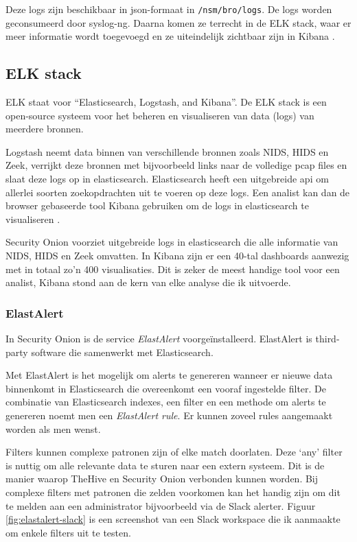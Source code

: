 \documentclass[a4paper,12pt]{report}
\begin{document}
Deze logs zijn beschikbaar in json-formaat in \lstinline|/nsm/bro/logs|.
De logs worden geconsumeerd door syslog-ng.
Daarna komen ze terrecht in de ELK stack, waar er meer informatie wordt toegevoegd en ze uiteindelijk zichtbaar zijn in Kibana \autocite{so:docs}.

\subsection{ELK stack}
ELK staat voor ``Elasticsearch, Logstash, and Kibana''.
De ELK stack is een open-source systeem voor het beheren en visualiseren van data (logs) van meerdere bronnen.

Logstash neemt data binnen van verschillende bronnen zoals NIDS, HIDS en Zeek, verrijkt deze bronnen met bijvoorbeeld links naar de volledige pcap files en slaat deze logs op in elasticsearch.
Elasticsearch heeft een uitgebreide api om allerlei soorten zoekopdrachten uit te voeren op deze logs.
Een analist kan dan de browser gebaseerde tool Kibana gebruiken om de logs in elasticsearch te visualiseren \autocite{elastic:what-is-elk}.

Security Onion voorziet uitgebreide logs in elasticsearch die alle informatie van NIDS, HIDS en Zeek omvatten.
In Kibana zijn er een 40-tal dashboards aanwezig met in totaal zo'n 400 visualisaties.
Dit is zeker de meest handige tool voor een analist, Kibana stond aan de kern van elke analyse die ik uitvoerde.

\subsubsection{ElastAlert}
In Security Onion is de service \emph{ElastAlert} voorgeïnstalleerd.
ElastAlert is third-party software die samenwerkt met Elasticsearch.

Met ElastAlert is het mogelijk om alerts te genereren wanneer er nieuwe data binnenkomt in Elasticsearch die overeenkomt een vooraf ingestelde filter.
De combinatie van Elasticsearch indexes, een filter en een methode om alerts te genereren noemt men een \emph{ElastAlert rule}.
Er kunnen zoveel rules aangemaakt worden als men wenst.

Filters kunnen complexe patronen zijn of elke match doorlaten.
Deze `any' filter is nuttig om alle relevante data te sturen naar een extern systeem.
Dit is de manier waarop TheHive en Security Onion verbonden kunnen worden.
Bij complexe filters met patronen die zelden voorkomen kan het handig zijn om dit te melden aan een administrator bijvoorbeeld via de Slack alerter.
Figuur \ref{fig:elastalert-slack} is een screenshot van een Slack workspace die ik aanmaakte om enkele filters uit te testen.
\end{document}
